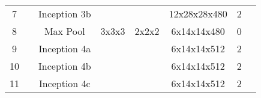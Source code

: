 \documentclass{bmvc2k}
\begin{document}
\begin{table*}[t]
\begin{tabular}{c|c|c|c|c|c|c|c}
7                                       &                                                                               & Inception 3b                                                         &                                                                              &                                                                         & 12x28x28x480                                                                  & 2                      &                                                                                  \\ \cline{3-8}
8                                       &                                                                               & Max Pool                                                             & 3x3x3                                                                        & 2x2x2                                                                   & 6x14x14x480                                                                   & 0                      &                                                                                  \\ \cline{3-8}
9                                       &                                                                               & Inception 4a                                                         &                                                                              &                                                                         & 6x14x14x512                                                                   & 2                      &                                                                                  \\ \cline{3-8}
10                                      &                                                                               & Inception 4b                                                         &                                                                              &                                                                         & 6x14x14x512                                                                   & 2                      &                                                                                  \\ \cline{3-8}
11                                      &                                                                               & Inception 4c                                                         &                                                                              &                                                                         & 6x14x14x512                                                                   & 2                      &                                                                                  \\ \cline{3-8}

\end{tabular}
\end{table*}
\end{document}
